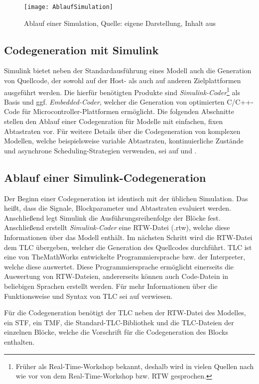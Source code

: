 \begin{figure}[h]
	\texttt{[image: AblaufSimulation]}
	\caption{Ablauf einer Simulation, Quelle: eigene Darstellung, Inhalt aus \cite{SFunc}}
\end{figure}

\subsection{Codegeneration mit Simulink}
Simulink bietet neben der Standardausführung eines Modell auch die Generation von Quellcode, der sowohl auf der Host- als auch auf anderen Zielplattformen ausgeführt werden. Die hierfür benötigten Produkte sind \textit{Simulink-Coder}\footnote{Früher als Real-Time-Workshop bekannt, deshalb wird in vielen Quellen nach wie vor von dem Real-Time-Workshop bzw. RTW gesprochen.} als Basis und ggf. \textit{Embedded-Coder}, welcher die Generation von optimierten C/C++-Code für Microcontroller-Plattformen ermöglicht. Die folgenden Abschnitte stellen den Ablauf einer Codegenration für Modelle mit einfachen, fixen Abtastraten vor. Für weitere Details über die Codegeneration von komplexen Modellen, welche beispielsweise variable Abtastraten, kontinuierliche Zustände und asynchrone Scheduling-Strategien verwenden, sei auf \cite{SimCoder} und \cite{EmbCoder}.

\subsection{Ablauf einer Simulink-Codegeneration}
Der Beginn einer Codegeneration ist identisch mit der üblichen Simulation. Das heißt, dass die Signale, Blockparameter und Abtastraten evaluiert werden. Anschließend legt Simulink die Ausführungsreihenfolge der Blöcke fest. Anschließend erstellt \textit{Simulink-Coder} eine RTW-Datei (.rtw), welche diese Informationen über das Modell enthält. Im nächsten Schritt wird die RTW-Datei dem \ac{TLC} übergeben, welcher die Generation des Quellcodes durchführt. \ac{TLC} ist eine von TheMathWorks entwickelte Programmiersprache bzw. der Interpreter, welche diese auswertet. Diese Programmiersprache ermöglicht einerseits die Auswertung von RTW-Dateien, andererseits können auch Code-Datein in beliebigen Sprachen erstellt werden. Für mehr Informationen über die Funktionsweise und Syntax von \ac{TLC} sei auf \cite{TLC} verwiesen.

Für die Codegeneration benötigt der \ac{TLC} neben der RTW-Datei des Modelles, ein \ac{STF}, ein \ac{TMF}, die Standard-TLC-Bibliothek und die \ac{TLC}-Dateien der einzelnen Blöcke, welche die Vorschrift für die Codegeneration des Blocks enthalten.

